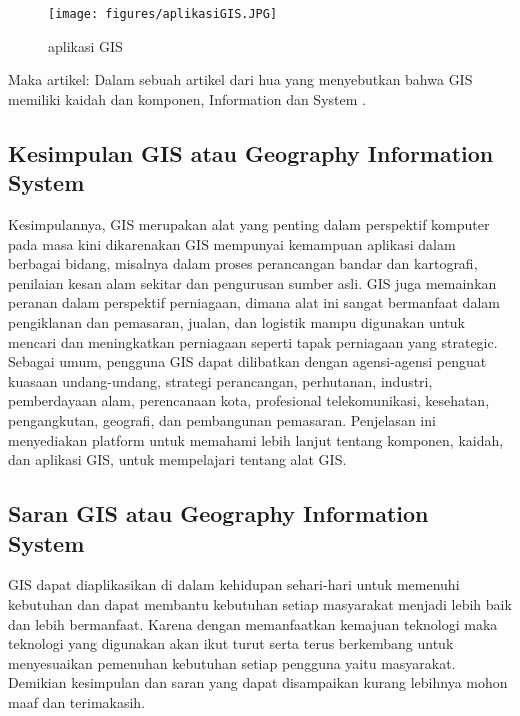 \begin{figure}[ht]
	\centerline{\texttt{[image: figures/aplikasiGIS.JPG]}}
	\caption{aplikasi GIS}
	\label{aplikasi GIS}
	\end{figure}

Maka artikel:
	Dalam sebuah artikel dari hua yang menyebutkan bahwa GIS memiliki kaidah dan komponen, Information dan System \cite{hua2017sistem}.


\subsection{Kesimpulan GIS atau Geography Information System}
Kesimpulannya, GIS merupakan alat yang penting dalam perspektif komputer pada masa kini dikarenakan GIS
mempunyai kemampuan aplikasi dalam berbagai bidang, misalnya dalam proses perancangan bandar dan kartografi,
penilaian kesan alam sekitar dan pengurusan sumber asli. GIS juga memainkan peranan dalam perspektif perniagaan,
dimana alat ini sangat bermanfaat dalam pengiklanan dan pemasaran, jualan, dan logistik 
mampu digunakan untuk mencari dan meningkatkan perniagaan seperti tapak perniagaan yang strategic. Sebagai umum, pengguna GIS dapat dilibatkan dengan agensi-agensi penguat kuasaan undang-undang, strategi
perancangan, perhutanan, industri, pemberdayaan alam, perencanaan kota, profesional
telekomunikasi, kesehatan, pengangkutan, geografi, dan pembangunan pemasaran. 
Penjelasan ini menyediakan platform untuk memahami lebih lanjut tentang komponen, kaidah, dan aplikasi GIS, 
untuk mempelajari tentang alat GIS.
\subsection{Saran GIS atau Geography Information System}

GIS dapat diaplikasikan di dalam kehidupan sehari-hari untuk memenuhi kebutuhan dan dapat membantu kebutuhan setiap masyarakat menjadi lebih baik dan lebih bermanfaat. Karena dengan memanfaatkan kemajuan teknologi maka teknologi yang digunakan akan ikut turut serta terus berkembang untuk menyesuaikan pemenuhan kebutuhan setiap pengguna yaitu masyarakat. Demikian kesimpulan dan saran yang dapat disampaikan kurang lebihnya mohon maaf dan terimakasih.

